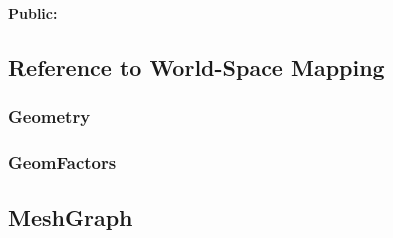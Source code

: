 \paragraph{Public:}



\subsection{Reference to World-Space Mapping}

\subsubsection{Geometry}


\subsubsection{GeomFactors}




\subsection{MeshGraph}